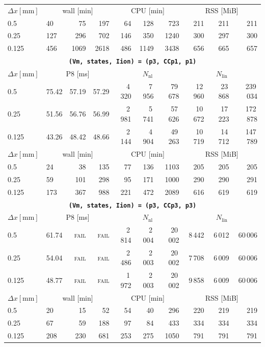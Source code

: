\documentclass[11pt,a4paper]{article}
\newcommand{\code}[1]{\texttt{\small #1}}
\begin{document}
\begin{center}
\begin{longtable}{l|lrr|rrr|rrr}
\hline
$ \Delta x [\text{mm}] $ & \multicolumn{3}{c|}{wall [min]} & \multicolumn{3}{c|}{CPU [min]} & \multicolumn{3}{c|}{RSS [MiB]}\\
0.5 & 40 & 75 & 197 & 64 & 128 & 723 & 211 & 211 & 211\\
0.25 & 127 & 296 & 702 & 146 & 350 & 1240 & 300 & 297 & 300\\
0.125 & 456 & 1069 & 2618 & 486 & 1149 & 3438 & 656 & 665 & 657\\
\hline
\hline
\multicolumn{10}{c}{\textbf{\code{(Vm, states, Iion) = (p3, CCp1, p1)}}}\\\hline
$ \Delta x [\text{mm}] $ & \multicolumn{3}{c|}{P8 [ms]} & \multicolumn{3}{c|}{$N_{\mathrm{nl}}$} & \multicolumn{3}{c|}{$N_{\mathrm{lin}}$}\\
0.5 & 75.42 & 57.19 & 57.29 & 4\,320 & 7\,956 & 79\,678 & 12\,960 & 23\,868 & 239\,034\\
0.25 & 51.56 & 56.76 & 56.99 & 2\,981 & 5\,741 & 57\,626 & 10\,672 & 17\,223 & 172\,878\\
0.125 & 43.26 & 48.42 & 48.66 & 2\,144 & 4\,904 & 49\,263 & 10\,719 & 14\,712 & 147\,789\\
\hline
$ \Delta x [\text{mm}] $ & \multicolumn{3}{c|}{wall [min]} & \multicolumn{3}{c|}{CPU [min]} & \multicolumn{3}{c|}{RSS [MiB]}\\
0.5 & 24 & 38 & 135 & 77 & 136 & 1103 & 205 & 205 & 205\\
0.25 & 59 & 101 & 298 & 95 & 171 & 1000 & 290 & 290 & 291\\
0.125 & 173 & 367 & 988 & 221 & 472 & 2089 & 616 & 619 & 619\\
\hline
\hline
\multicolumn{10}{c}{\textbf{\code{(Vm, states, Iion) = (p3, CCp3, p3)}}}\\\hline
$ \Delta x [\text{mm}] $ & \multicolumn{3}{c|}{P8 [ms]} & \multicolumn{3}{c|}{$N_{\mathrm{nl}}$} & \multicolumn{3}{c|}{$N_{\mathrm{lin}}$}\\
0.5 & 61.74 & \textsc{fail} & \textsc{fail} & 2\,814 & 2\,004 & 20\,002 & 8\,442 & 6\,012 & 60\,006\\
0.25 & 54.04 & \textsc{fail} & \textsc{fail} & 2\,486 & 2\,003 & 20\,002 & 7\,708 & 6\,009 & 60\,006\\
0.125 & 48.77 & \textsc{fail} & \textsc{fail} & 1\,972 & 2\,003 & 20\,002 & 9\,858 & 6\,009 & 60\,006\\
\hline
$ \Delta x [\text{mm}] $ & \multicolumn{3}{c|}{wall [min]} & \multicolumn{3}{c|}{CPU [min]} & \multicolumn{3}{c|}{RSS [MiB]}\\
0.5 & 20 & 15 & 52 & 54 & 40 & 296 & 220 & 219 & 219\\
0.25 & 67 & 59 & 188 & 97 & 84 & 433 & 334 & 334 & 334\\
0.125 & 208 & 230 & 681 & 253 & 275 & 1050 & 791 & 791 & 791\\
\hline
\bottomrule\end{longtable}\end{center}
\end{document}
